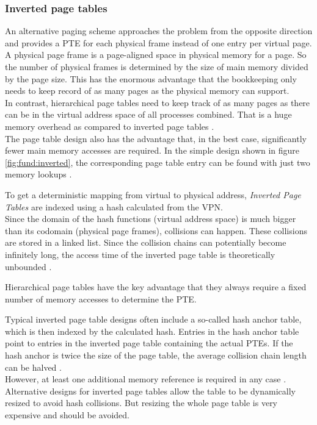 \subsubsection{Inverted page tables}
An alternative paging scheme approaches the problem from the opposite direction and provides a PTE
for each physical frame instead of one entry per virtual page.\\
A physical page frame is a page-aligned space in physical memory for a page.
So the number of physical frames is determined by the size of main memory divided by the page size.
This has the enormous advantage that the bookkeeping only needs to keep record of as many pages
as the physical memory can support.\\
In contrast, hierarchical page tables need to keep track of as many pages as there can be in the virtual
address space of all processes combined. That is a huge memory overhead as compared to inverted page tables
\cite{jacob1998look}.\\
The page table design also has the advantage that, in the best case, significantly fewer main memory
accesses are required. In the simple design shown in figure \ref{fig:fund:inverted}, the corresponding
page table entry can be found with just two memory lookups \cite{skarlatos2020elastic}.

To get a deterministic mapping from virtual to physical address, \emph{Inverted Page Tables} are indexed
using a hash calculated from the VPN.\\
Since the domain of the hash functions (virtual address space) is much bigger than its codomain (physical page frames),
collisions can happen. These collisions are stored in a linked list. Since
the collision chains can potentially become infinitely long, the access time of the inverted page table is theoretically
unbounded \cite{tanenbaumOS}.

Hierarchical page tables have the key advantage that they always require
a fixed number of memory accesses to determine the PTE.

Typical inverted page table designs often include a so-called hash anchor table, which is then
indexed by the calculated hash. Entries in the hash anchor table point to entries in the inverted page table
containing the actual PTEs. If the hash anchor is twice the size
of the page table, the average collision chain length can be halved \cite{jacob1998virtualissues}.\\
However, at least one additional memory reference is required in any case \cite{jacob1998virtualissues}.
Alternative designs for inverted page tables allow the table to be dynamically resized to avoid hash collisions.
But resizing the whole page table is very expensive and should be avoided\cite{skarlatos2020elastic}.

